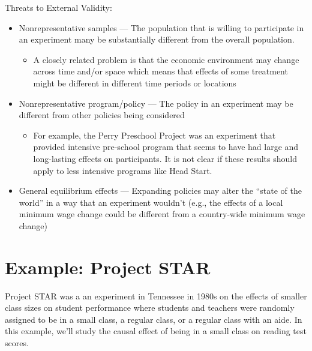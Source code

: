 \documentclass[
  letterpaper,
  DIV=11,
  numbers=noendperiod]{scrreprt}
\providecommand{\tightlist}{%
  \setlength{\itemsep}{0pt}\setlength{\parskip}{0pt}}\usepackage{longtable,booktabs,array}
\begin{document}
Threats to External Validity:

\begin{itemize}
\item
  Nonrepresentative samples --- The population that is willing to
  participate in an experiment many be substantially different from the
  overall population.

  \begin{itemize}
  \tightlist
  \item
    A closely related problem is that the economic environment may
    change across time and/or space which means that effects of some
    treatment might be different in different time periods or locations
  \end{itemize}
\item
  Nonrepresentative program/policy --- The policy in an experiment may
  be different from other policies being considered

  \begin{itemize}
  \tightlist
  \item
    For example, the Perry Preschool Project was an experiment that
    provided intensive pre-school program that seems to have had large
    and long-lasting effects on participants. It is not clear if these
    results should apply to less intensive programs like Head Start.
  \end{itemize}
\item
  General equilibrium effects --- Expanding policies may alter the
  ``state of the world'' in a way that an experiment wouldn't (e.g., the
  effects of a local minimum wage change could be different from a
  country-wide minimum wage change)
\end{itemize}

\section{Example: Project STAR}\label{example-project-star}

Project STAR was a an experiment in Tennessee in 1980s on the effects of
smaller class sizes on student performance where students and teachers
were randomly assigned to be in a small class, a regular class, or a
regular class with an aide. In this example, we'll study the causal
effect of being in a small class on reading test scores.
\end{document}
